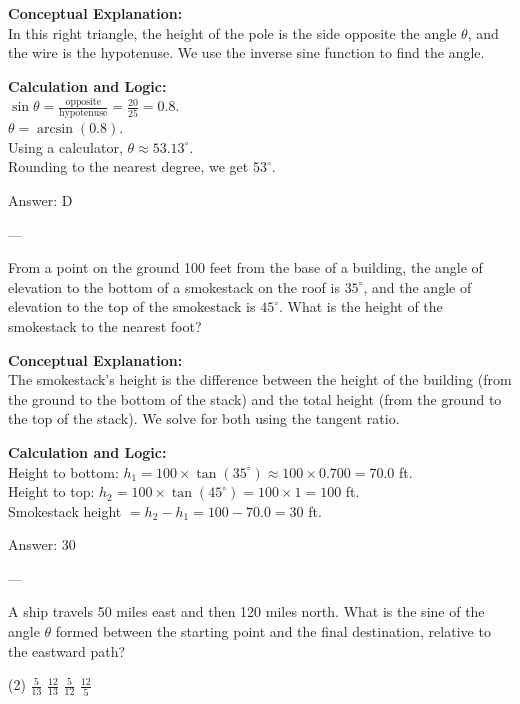 \documentclass[11pt,paper=a4,answers]{exam}
\begin{document}
\begin{questions}
\begin{solution}
\textbf{Conceptual Explanation:} \\
In this right triangle, the height of the pole is the side opposite the angle $\theta$, and the wire is the hypotenuse. We use the inverse sine function to find the angle.

\vspace{10pt}
\textbf{Calculation and Logic:} \\
$\sin \theta = \frac{\text{opposite}}{\text{hypotenuse}} = \frac{20}{25} = 0.8$. \\
$\theta = \arcsin(0.8)$. \\
Using a calculator, $\theta \approx 53.13^\circ$. \\
Rounding to the nearest degree, we get $53^\circ$.

\vspace{15pt}
Answer: \colorbox{yellow!100}{D}
\end{solution}

---

\question
From a point on the ground 100 feet from the base of a building, the angle of elevation to the bottom of a smokestack on the roof is $35^\circ$, and the angle of elevation to the top of the smokestack is $45^\circ$. What is the height of the smokestack to the nearest foot?

\begin{solution}
\textbf{Conceptual Explanation:} \\
The smokestack's height is the difference between the height of the building (from the ground to the bottom of the stack) and the total height (from the ground to the top of the stack). We solve for both using the tangent ratio.

\vspace{10pt}
\textbf{Calculation and Logic:} \\
Height to bottom: $h_1 = 100 \times \tan(35^\circ) \approx 100 \times 0.700 = 70.0$ ft. \\
Height to top: $h_2 = 100 \times \tan(45^\circ) = 100 \times 1 = 100$ ft. \\
Smokestack height $= h_2 - h_1 = 100 - 70.0 = 30$ ft.

\vspace{15pt}
Answer: \colorbox{yellow!100}{30}
\end{solution}

---

\question
A ship travels 50 miles east and then 120 miles north. What is the sine of the angle $\theta$ formed between the starting point and the final destination, relative to the eastward path?
\begin{tasks}(2)
    \task $\frac{5}{13}$
    \task $\frac{12}{13}$
    \task $\frac{5}{12}$
    \task $\frac{12}{5}$
\end{tasks}


\end{questions}
\end{document}

